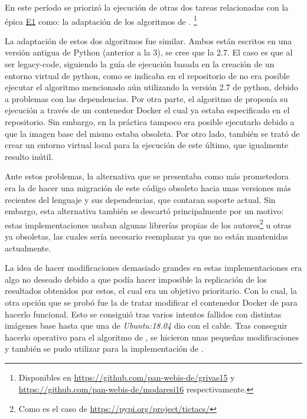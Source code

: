 En este período se priorizó la ejecución de otras dos tareas relacionadas con la épica \hyperref[tab:user-stories]{E1} como: la adaptación de los algoritmos de \citet{grivas2015author, modaresi:2016}. \footnote{Disponibles en \url{https://github.com/pan-webis-de/grivas15} y \url{https://github.com/pan-webis-de/modaresi16} respectivamente.}

La adaptación de estos dos algoritmos fue similar. Ambos están escritos en una versión antigua de Python (anterior a la 3), se cree que la 2.7. El caso es que al ser \gls{legacy-code}, siguiendo la guía de ejecución basada en la creación de un entorno virtual de python, como se indicaba en el repositorio de \citet{grivas2015author} no era posible ejecutar el algoritmo mencionado aún utilizando la versión 2.7 de python, debido a problemas con las dependencias. Por otra parte, el algoritmo de \citet{modaresi:2016} proponía su ejecución a través de un contenedor Docker el cual ya estaba especificado en el repositorio. Sin embargo, en la práctica tampoco era posible ejecutarlo debido a que la imagen base del mismo estaba obsoleta. Por otro lado, también se trató de crear un entorno virtual local para la ejecución de este último, que igualmente resulto inútil.

Ante estos problemas, la alternativa que se presentaba como más prometedora era la de hacer una migración de este código obsoleto hacia unas versiones más recientes del lenguaje y sus dependencias, que contaran soporte actual. Sin embargo, esta alternativa también se descartó principalmente por un motivo: estas implementaciones usaban algunas librerías propias de los autores\footnote{Como es el caso de \url{https://pypi.org/project/tictacs/}} u otras ya obsoletas, las cuales sería necesario reemplazar ya que no están mantenidas actualmente. 

La idea de hacer modificaciones demasiado grandes en estas implementaciones era algo no deseado debido a que podía hacer imposible la replicación de los resultados obtenidos por estos, el cual era un objetivo prioritario. Con lo cual, la otra opción que se probó fue la de tratar modificar el contenedor Docker de \citet{modaresi:2016} para hacerlo funcional. Esto se consiguió tras varios intentos fallidos con distintas imágenes base hasta que una de \textit{Ubuntu:18.04} dio con el cable. Tras conseguir hacerlo operativo para el algoritmo de \citet{modaresi:2016}, se hicieron unas pequeñas modificaciones y también se pudo utilizar para la implementación de \citet{grivas2015author}.

